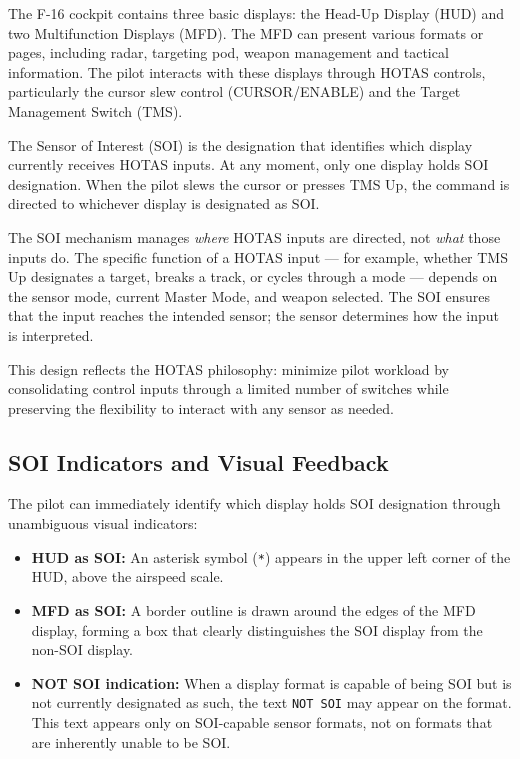 \documentclass[11pt, a4paper, twoside]{report}
\begin{document}
The F-16 cockpit contains three basic displays: the Head-Up Display (HUD) and two Multifunction Displays (MFD). The MFD can present various formats or pages, including radar, targeting pod, weapon management and tactical information. The pilot interacts with these displays through HOTAS controls, particularly the cursor slew control (CURSOR/ENABLE) and the Target Management Switch (TMS).

The Sensor of Interest (SOI) is the designation that identifies which display currently receives HOTAS inputs. At any moment, only one display holds SOI designation. When the pilot slews the cursor or presses TMS Up, the command is directed to whichever display is designated as SOI.

The SOI mechanism manages \textit{where} HOTAS inputs are directed, not \textit{what} those inputs do. The specific function of a HOTAS input — for example, whether TMS Up designates a target, breaks a track, or cycles through a mode — depends on the sensor mode, current Master Mode, and weapon selected. The SOI ensures that the input reaches the intended sensor; the sensor determines how the input is interpreted.

This design reflects the HOTAS philosophy: minimize pilot workload by consolidating control inputs through a limited number of switches while preserving the flexibility to interact with any sensor as needed.


\subsection{SOI Indicators and Visual Feedback}
\label{sec:C2-S1-S2}

The pilot can immediately identify which display holds SOI designation through unambiguous visual indicators:

\begin{itemize}
	\item \textbf{HUD as SOI:} An asterisk symbol (\texttt{*}) appears in the upper left corner of the HUD, above the airspeed scale.
	\item \textbf{MFD as SOI:} A border outline is drawn around the edges of the MFD display, forming a box that clearly distinguishes the SOI display from the non-SOI display.
	\item \textbf{NOT SOI indication:} When a display format is capable of being SOI but is not currently designated as such, the text \texttt{NOT SOI} may appear on the format. This text appears only on SOI-capable sensor formats, not on formats that are inherently unable to be SOI.
\end{itemize}
\end{document}
